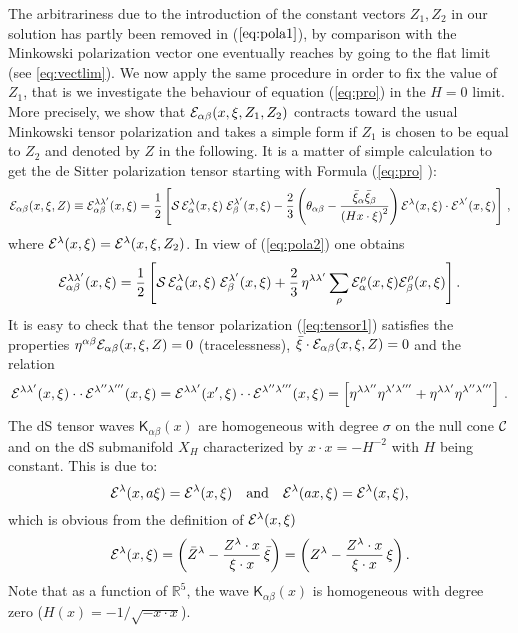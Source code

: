 \documentclass[a4paper,11pt,showpacs,preprintnumbers]{revtex4}
\def\setR{\mathbb{R}}
\def\K{\textsf{K}}
\begin{document}
The arbitrariness due to the introduction of  the constant vectors
$Z_{1},Z_{2}$ in our solution has partly been removed in
($\ref{eq:pola1}$), by comparison with the Minkowski polarization
vector one eventually reaches by going to the flat limit (see
\ref{eq:vectlim}). We now apply the same procedure in order to fix
the value of $Z_1$, that is we investigate the behaviour of
equation (\ref{eq:pro}) in the $H=0$ limit. More precisely,  we
show that ${\cal E}_{\alpha \beta}(x,\xi,Z_1,Z_2)$ contracts
toward the usual Minkowski tensor polarization and takes a simple
form if $Z_1$ is chosen to be equal to $Z_2$ and denoted by $Z$ in
the following. It is a matter of simple calculation to get the de
Sitter polarization tensor starting with Formula (\ref{eq:pro} ):
\begin{equation}
{\cal E}_{\alpha\beta}(x,\xi,Z)\equiv {\cal
E}_{\alpha\beta}^{\lambda\lambda'}(x,\xi)=\frac{1}{2}
 \left[ {\cal S}\,{\cal
E}_{\alpha}^{\lambda}(x,\xi)\; {\cal
E}_{\beta}^{\lambda'}(x,\xi)-\frac{2}{3}
\left(\theta_{\alpha\beta}
-\frac{\bar{\xi}_{\alpha}\bar{\xi}_{\beta}}{\left(Hx\cdot\xi\right)^{2}}\right)
{\cal E}^{\lambda}(x,\xi)\cdot{\cal E}^{\lambda'}(x,\xi)\right]\,,
\end{equation}
where ${\cal E }^{\lambda}(x,\xi) ={\cal E
}^{\lambda}(x,\xi,Z_2)$. In view of (\ref{eq:pola2}) one obtains
\begin{equation}\label{eq:tensor1}
{\cal E}_{\alpha\beta}^{\lambda\lambda'}(x,\xi)= \frac{1}{2}\left[
{\cal S}\,{\cal E}_{\alpha}^{\lambda}(x,\xi)\; {\cal
E}_{\beta}^{\lambda'}(x,\xi)+\frac{2}{3}\, \eta^{\lambda\lambda'}
\sum_{\rho}{\cal E }^{\rho}_{\alpha}(x,\xi){\cal E
}^{\rho}_{\beta}(x,\xi) \right].
\end{equation}
It is easy to check that the tensor polarization
(\ref{eq:tensor1}) satisfies the properties
$\eta^{\alpha\beta}{\cal E}_{\alpha\beta}(x,\xi,Z)=0$
(tracelessness), $\bar\xi\cdot {\cal E}_{\alpha\beta}(x,\xi,Z)=0$
and the  relation
\begin{equation}
{\cal E}^{\lambda\lambda'}(x,\xi) \cdot \cdot \,{\cal
E}^{\lambda''\lambda'''}(x,\xi) ={\cal
E}^{\lambda\lambda'}(x',\xi) \cdot \cdot \, {\cal
E}^{\lambda''\lambda'''}(x,\xi)=\left[\eta^{\lambda\lambda''}\eta^{\lambda'\lambda'''}
+\eta^{\lambda\lambda'}\eta^{\lambda''\lambda'''}\right]\,.
\end{equation}
The dS tensor waves ${\K}_{\alpha\beta}(x)$ are homogeneous with
degree $\sigma$ on the null cone ${\cal C}$ and on the dS
submanifold $X_{H}$ characterized by $x\cdot x=-H^{-2}$ with $H$
being constant. This is due to:
\begin{equation}
{\cal E}^{\lambda}(x,a\xi)={\cal
E}^{\lambda}(x,\xi)\quad\mbox{and}\quad {\cal
E}^{\lambda}(ax,\xi)={\cal E}^{\lambda}(x,\xi), \nonumber
\end{equation}
which is obvious from the definition of ${\cal
E}^{\lambda}(x,\xi)$
\begin{equation}
{\cal
E}^{\lambda}(x,\xi)=\left(\bar{Z}^{\lambda}-\frac{Z^{\lambda}\cdot
x}{\xi\cdot x
}\,\bar{\xi}\right)=\left({Z}^{\lambda}-\frac{Z^{\lambda}\cdot
x}{\xi\cdot x}\,{\xi}\right).
\end{equation}
Note that as a function of $\setR^{5}$, the wave
${\K}_{\alpha\beta}(x)$ is homogeneous with degree zero
($H(x)=-1/\sqrt{- x\cdot x }$).
\end{document}
